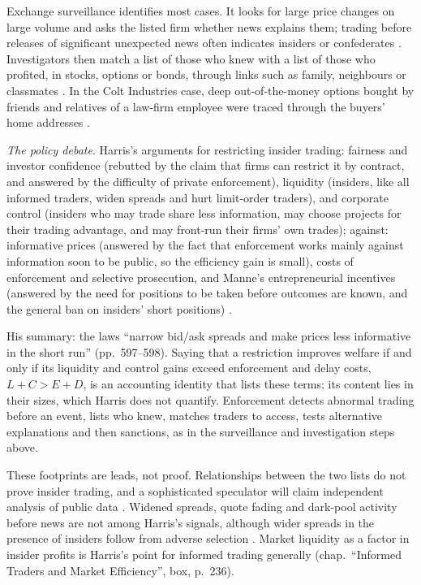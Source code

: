 \begin{qfresult}
 Exchange surveillance identifies most cases. It looks for large price changes on large volume and asks the listed firm whether news explains them; trading before releases of significant unexpected news often indicates insiders or confederates \citep[sec.~29.2, p.~588]{alpha-harris}. Investigators then match a list of those who knew with a list of those who profited, in stocks, options or bonds, through links such as family, neighbours or classmates \citep[same sec., pp.~588--589 and box]{alpha-harris}. In the Colt Industries case, deep out-of-the-money options bought by friends and relatives of a law-firm employee were traced through the buyers' home addresses \citep[same sec., box, p.~589]{alpha-harris}.

\emph{The policy debate}. Harris's arguments for restricting insider trading: fairness and investor confidence (rebutted by the claim that firms can restrict it by contract, and answered by the difficulty of private enforcement), liquidity (insiders, like all informed traders, widen spreads and hurt limit-order traders), and corporate control (insiders who may trade share less information, may choose projects for their trading advantage, and may front-run their firms' own trades); against: informative prices (answered by the fact that enforcement works mainly against information soon to be public, so the efficiency gain is small), costs of enforcement and selective prosecution, and Manne's entrepreneurial incentives (answered by the need for positions to be taken before outcomes are known, and the general ban on insiders' short positions) \citep[sec.~29.3, pp.~591--597]{alpha-harris}.

His summary: the laws ``narrow bid/ask spreads and make prices less informative in the short run'' (pp.~597--598). Saying that a restriction improves welfare if and only if its liquidity and control gains exceed enforcement and delay costs, $L+C>E+D$, is an accounting identity that lists these terms; its content lies in their sizes, which Harris does not quantify. Enforcement detects abnormal trading before an event, lists who knew, matches traders to access, tests alternative explanations and then sanctions, as in the surveillance and investigation steps above.

 These footprints are leads, not proof. Relationships between the two lists do not prove insider trading, and a sophisticated speculator will claim independent analysis of public data \citep[same sec., pp.~589--590]{alpha-harris}. Widened spreads, quote fading and dark-pool activity before news are not among Harris's signals, although wider spreads in the presence of insiders follow from adverse selection \citep[sec.~29.3.1.2, p.~591]{alpha-harris}. Market liquidity as a factor in insider profits is Harris's point for informed trading generally (chap.~``Informed Traders and Market Efficiency'', box, p.~236).


\end{qfresult}
